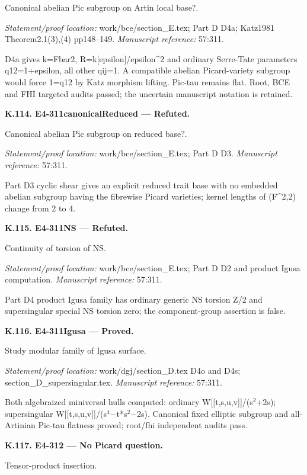 Canonical abelian Pic subgroup on Artin local base?.
\par\emph{Statement/proof location:} work/bce/section\_E.tex; Part D D4a; Katz1981 Theorem2.1(3),(4) pp148–149.
\emph{Manuscript reference:} 57:311.
\par D4a gives k=Fbar2, R=k[epsilon]/epsilon\textasciicircum{}2 and ordinary Serre-Tate parameters q12=1+epsilon, all other qij=1. A compatible abelian Picard-variety subgroup would force 1=q12 by Katz morphism lifting. Pic-tau remains flat. Root, BCE and FHI targeted audits passed; the uncertain manuscript notation is retained.
\par\medskip\noindent\textbf{K.114. E4-311canonicalReduced --- Refuted.}\par
Canonical abelian Pic subgroup on reduced base?.
\par\emph{Statement/proof location:} work/bce/section\_E.tex; Part D D3.
\emph{Manuscript reference:} 57:311.
\par Part D3 cyclic shear gives an explicit reduced trait base with no embedded abelian subgroup having the fibrewise Picard varieties; kernel lengths of (F\textasciicircum{}2,2) change from 2 to 4.
\par\medskip\noindent\textbf{K.115. E4-311NS --- Refuted.}\par
Continuity of torsion of NS.
\par\emph{Statement/proof location:} work/bce/section\_E.tex; Part D D2 and product Igusa computation.
\emph{Manuscript reference:} 57:311.
\par Part D4 product Igusa family has ordinary generic NS torsion Z/2 and supersingular special NS torsion zero; the component-group assertion is false.
\par\medskip\noindent\textbf{K.116. E4-311Igusa --- Proved.}\par
Study modular family of Igusa surface.
\par\emph{Statement/proof location:} work/dgj/section\_D.tex D4o and D4s; section\_D\_supersingular.tex.
\emph{Manuscript reference:} 57:311.
\par Both algebraized miniversal hulls computed: ordinary W[[t,s,u,v]]/(s\ensuremath{{}^2}+2s); supersingular W[[t,s,u,v]]/(s\ensuremath{{}^4}−t*s\ensuremath{{}^2}−2s). Canonical fixed elliptic subgroup and all-Artinian Pic-tau flatness proved; root/fhi independent audits pass.
\par\medskip\noindent\textbf{K.117. E4-312 --- No Picard question.}\par
Tensor-product insertion.
